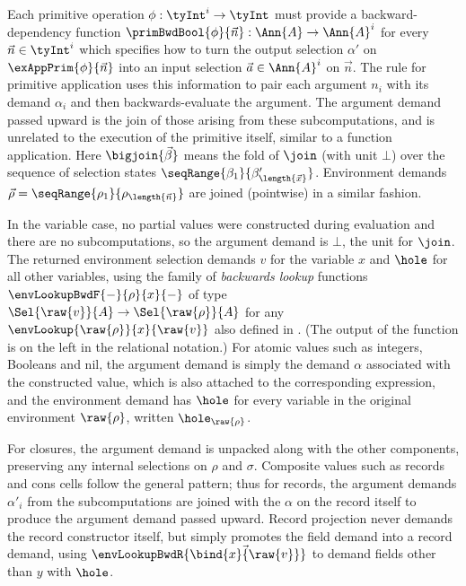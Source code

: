  Each primitive operation $\phi: \tyInt^{i} \to \tyInt$ must provide a backward-dependency  function $\primBwdBool{\phi}{\vec{n}}: \Ann{A} \to \Ann{A}^i$ for every $\vec{n} \in \tyInt^i$ which specifies how to turn the output selection $\alpha'$ on $\exAppPrim{\phi}{\vec{n}}$ into an input selection $\vec{a} \in \Ann{A}^i$ on $\vec{n}$. The rule for primitive application uses this information to pair each argument $n_i$ with its demand $\alpha_i$ and then backwards-evaluate the argument. The argument demand passed upward is the join of those arising from these subcomputations, and is unrelated to the execution of the primitive itself, similar to a function application. Here $\bigjoin{\vec{\beta}}$ means the fold of $\join$ (with unit $\bot$) over the sequence of selection states $\seqRange{\beta_1}{\beta_{\length{\vec{x}}}'}$. Environment demands $\vec{\rho} = \seqRange{\rho_1}{\rho_{\length{\vec{n}}}}$ are joined (pointwise) in a similar fashion.

 In the variable case, no partial values were constructed during evaluation and there are no subcomputations, so the argument demand is $\bot$, the unit for $\join$. The returned environment selection demands $v$ for the variable $x$ and $\hole$ for all other variables, using the family of \emph{backwards lookup} functions $\envLookupBwdF{-}{\rho}{x}{-}$ of type $\Sel{\raw{v}}{A} \to \Sel{\raw{\rho}}{A}$ for any $\envLookup{\raw{\rho}}{x}{\raw{v}}$ also defined in . (The output of the function is on the left in the relational notation.) For atomic values such as integers, Booleans and nil, the argument demand is simply the demand $\alpha$ associated with the constructed value, which is also attached to the corresponding expression, and the environment demand has $\hole$ for every variable in the original environment $\raw{\rho}$, written $\hole_{\raw{\rho}}$.

For closures, the argument demand is unpacked along with the other components, preserving any internal selections on $\rho$ and $\sigma$. Composite values such as records and cons cells follow the general pattern; thus for records, the argument demands $\alpha'_i$ from the subcomputations are joined with the $\alpha$ on the record itself to produce the argument demand passed upward. Record projection never demands the record constructor itself, but simply promotes the field demand into a record demand, using $\envLookupBwdR{\vec{\bind{x}{\raw{v}}}}$ to demand fields other than $y$ with $\hole$.

